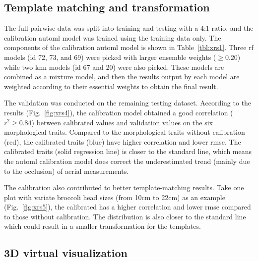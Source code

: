 

\subsection{Template matching and transformation}

The full pairwise data was split into training and testing with a 4:1 ratio, and the calibration \gls{automl} model was trained using the training data only. The components of the calibration \gls{automl} model is shown in Table~\ref{tbl:xrs1}. Three \gls{rf} models (id 72, 73, and 69) were picked with larger ensemble weights ($\geq 0.20$) while two \gls{knn} models (id 67 and 20) were also picked. These models are combined as a mixture model, and then the results output by each model are weighted according to their essential weights to obtain the final result.



The validation was conducted on the remaining testing dataset. According to the results (Fig.~\ref{fig:xrs4}), the calibration model obtained a good correlation ($r^2 \geq 0.84$) between calibrated values and validation values on the six morphological traits. Compared to the morphological traits without calibration (red), the calibrated traits (blue) have higher correlation and lower \gls{rmse}. The calibrated traits (solid regression line) is closer to the standard line, which means the \gls{automl} calibration model does correct the underestimated trend (mainly due to the occlusion) of aerial measurements.



The calibration also contributed to better template-matching results. Take one plot with variate broccoli head sizes (from 10cm to 22cm) as an example (Fig.~\ref{fig:xrs5}), the calibrated has a higher correlation and lower \gls{rmse} compared to those without calibration. The distribution is also closer to the standard line which could result in a smaller transformation for the templates.



\subsection{3D virtual visualization}

